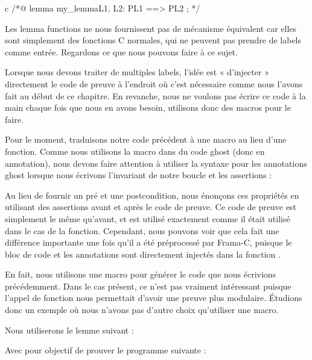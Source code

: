 \begin{CodeBlock}{c}
/*@
  lemma my_lemma{L1, L2}:  P{L1} ==> P{L2} ;
*/
\end{CodeBlock}


Les lemma functions ne nous fournissent pas de mécanisme équivalent car elles
sont simplement des fonctions C normales, qui ne peuvent pas prendre de
labels comme entrée. Regardons ce que nous pouvons faire à ce sujet.





Lorsque nous devons traiter de multiples labels, l'idée est « d'injecter »
directement le code de preuve à l'endroit où c'est nécessaire comme nous 
l'avons fait au début de ce chapitre. En revanche, nous ne voulons pas écrire
ce code à la main chaque fois que nous en avons besoin, utilisons donc des
macros pour le faire.


Pour le moment, traduisons notre code précédent à une macro au lieu d'une
fonction. Comme nous utilisons la macro dans du code ghost (donc en annotation),
nous devons faire attention à utiliser la syntaxe pour les annotations ghost
lorsque nous écrivons l'invariant de notre boucle et les assertions :




Au lieu de fournir un pré et une postcondition, nous énonçons ces propriétés en
utilisant des assertions avant et après le code de preuve. Ce code de preuve est
simplement le même qu'avant, et est utilisé exactement comme il était utilisé dans
le cas de la fonction. Cependant, nous pouvons voir que cela fait une différence
importante une fois qu'il a été préprocessé par Frama-C, puisque le bloc de code
et les annotations sont directement injectés dans la fonction 
.




En fait, nous utilisons une macro pour générer le code que nous écrivions
précédemment. Dans le cas présent, ce n'est pas vraiment intéressant puisque
l'appel de fonction nous permettait d'avoir une preuve plus modulaire. Étudions
donc un exemple où nous n'avons pas d'autre choix qu'utiliser une macro.


Nous utiliserons le lemme suivant :




Avec pour objectif de prouver le programme suivante :




